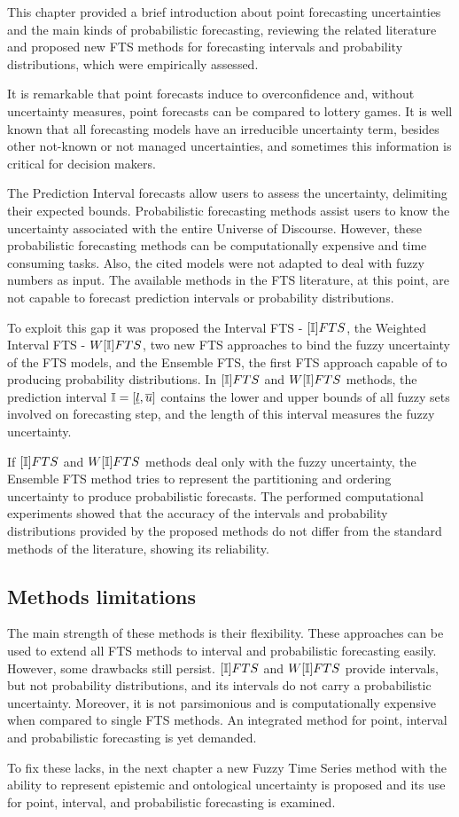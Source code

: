 This chapter provided a brief introduction about point forecasting uncertainties and the main kinds of probabilistic forecasting, reviewing the related literature and proposed new FTS methods for forecasting intervals and probability distributions, which were empirically assessed.

It is remarkable that point forecasts induce to overconfidence and,  without uncertainty measures, point forecasts can be compared to lottery games. It is well known that all forecasting models have an irreducible uncertainty term, besides other not-known or not managed uncertainties, and sometimes this information is critical for decision makers.

The Prediction Interval forecasts allow users to assess the uncertainty, delimiting their expected bounds. Probabilistic forecasting methods assist users to know the uncertainty associated with the entire Universe of Discourse. However, these probabilistic forecasting methods can be computationally expensive and time consuming tasks. Also, the cited models were not adapted to deal with fuzzy numbers as input. The available methods in the FTS literature, at this point, are not capable to forecast prediction intervals or probability distributions.

To exploit this gap it was proposed the Interval FTS - $[\mathbb{I}]FTS$, the Weighted Interval FTS - $W[\mathbb{I}]FTS$, two new FTS approaches to bind the fuzzy uncertainty of the FTS models, and the Ensemble FTS, the first FTS approach capable of to producing probability distributions. In $[\mathbb{I}]FTS$ and $W[\mathbb{I}]FTS$ methods, the prediction interval $\mathbb{I} = [\underline{l},\overline{u}{]}$ contains the lower and upper bounds of all fuzzy sets involved on forecasting step, and the length of this interval measures the fuzzy uncertainty.

If $[\mathbb{I}]FTS$ and $W[\mathbb{I}]FTS$ methods deal only with the fuzzy uncertainty, the Ensemble FTS method tries to represent the partitioning and ordering uncertainty to produce probabilistic forecasts. The performed computational experiments showed that the accuracy of the intervals and probability distributions provided by the proposed methods do not differ from the standard methods of the literature, showing its reliability.

\subsection{Methods limitations}

The main strength of these methods is their flexibility. These approaches can be used to extend all FTS methods to interval and probabilistic forecasting easily. However, some drawbacks still persist.  $[\mathbb{I}]FTS$ and $W[\mathbb{I}]FTS$ provide intervals, but not probability distributions, and its intervals do not carry a probabilistic uncertainty. Moreover, it is not parsimonious and is computationally expensive when compared to single FTS methods. An integrated method for point, interval and probabilistic forecasting is yet demanded. 

To fix these lacks, in the next chapter a new Fuzzy Time Series method with the ability to  represent epistemic and ontological uncertainty is proposed and its use for point, interval, and probabilistic forecasting is examined.

